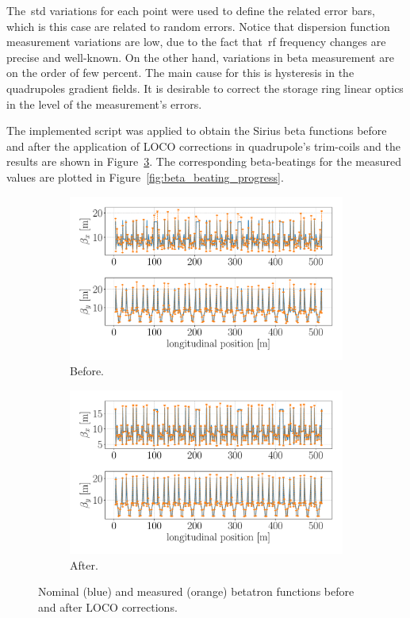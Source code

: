The~\gls{std} variations for each point were used to define the related error bars, which is this case are related to random errors. Notice that dispersion function measurement variations are low, due to the fact that~\gls{rf} frequency changes are precise and well-known. On the other hand, variations in beta measurement are on the order of few percent. The main cause for this is hysteresis in the quadrupoles gradient fields. It is desirable to correct the storage ring linear optics in the level of the measurement's errors.

The implemented script was applied to obtain the Sirius beta functions before and after the application of LOCO corrections in quadrupole's trim-coils and the results are shown in Figure~\ref{fig:beta_tuneshift}. The corresponding beta-beatings for the measured values are plotted in Figure~\ref{fig:beta_beating_progress}.
\begin{figure}
\centering
\begin{subfigure}[t]{0.49\textwidth}
\includegraphics[width=1.0\textwidth]{figures/beta_before_big.pdf}
    \caption{Before.}
    \label{subfig:beta_before}
\end{subfigure}
 \begin{subfigure}[t]{0.49\textwidth}
\includegraphics[width=1.0\textwidth]{figures/beta_after_big.pdf}
    \caption{After.}
    \label{subfig:beta_after}
\end{subfigure}
\caption{Nominal (blue) and measured (orange) betatron functions before and after LOCO corrections.}
\label{fig:beta_tuneshift}
\end{figure}
